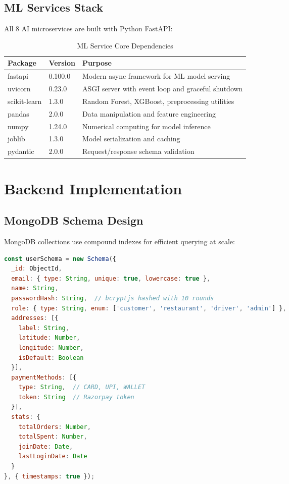 \documentclass[12pt,a4paper]{report}
\begin{document}
\begin{itemize}
\subsection{ML Services Stack}
All 8 AI microservices are built with Python FastAPI:

\begin{table}[H]
\centering
\caption{ML Service Core Dependencies}
\begin{tabular}{p{3.5cm} p{2cm} p{4cm}}
\toprule
\textbf{Package} & \textbf{Version} & \textbf{Purpose} \\
\midrule
fastapi & 0.100.0 & Modern async framework for ML model serving \\
uvicorn & 0.23.0 & ASGI server with event loop and graceful shutdown \\
scikit-learn & 1.3.0 & Random Forest, XGBoost, preprocessing utilities \\
pandas & 2.0.0 & Data manipulation and feature engineering \\
numpy & 1.24.0 & Numerical computing for model inference \\
joblib & 1.3.0 & Model serialization and caching \\
pydantic & 2.0.0 & Request/response schema validation \\
\bottomrule
\end{tabular}
\end{table}

\section{Backend Implementation}

\subsection{MongoDB Schema Design}

MongoDB collections use compound indexes for efficient querying at scale:

\begin{lstlisting}[language=javascript, caption={Mongoose User Model}]
const userSchema = new Schema({
  _id: ObjectId,
  email: { type: String, unique: true, lowercase: true },
  name: String,
  passwordHash: String,  // bcryptjs hashed with 10 rounds
  role: { type: String, enum: ['customer', 'restaurant', 'driver', 'admin'] },
  addresses: [{
    label: String,
    latitude: Number,
    longitude: Number,
    isDefault: Boolean
  }],
  paymentMethods: [{
    type: String,  // CARD, UPI, WALLET
    token: String  // Razorpay token
  }],
  stats: {
    totalOrders: Number,
    totalSpent: Number,
    joinDate: Date,
    lastLoginDate: Date
  }
}, { timestamps: true });


\end{lstlisting}
\end{itemize}
\end{document}
